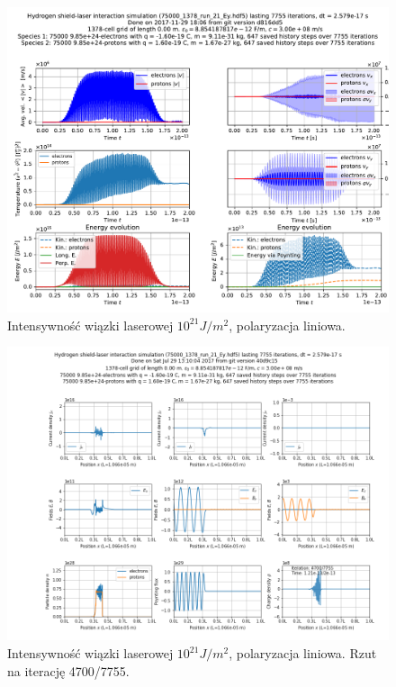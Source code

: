 
\begin{figure}[h!]
  \includegraphics[width=\textwidth]{Images/75000_1378_run_21_Ey}
  \caption{Intensywność wiązki laserowej $10^{21} J/m^2$, polaryzacja liniowa.\label{fig:laser-21-Ey}}
\end{figure}

\begin{figure}[h!]
  \includegraphics[width=\textwidth]{Images/75000_1378_run_21_Ey_004700}
  \caption{Intensywność wiązki laserowej $10^{21} J/m^2$, polaryzacja liniowa. Rzut na iterację 4700/7755.\label{fig:laser-21-Ey-snapshot}}
\end{figure}

